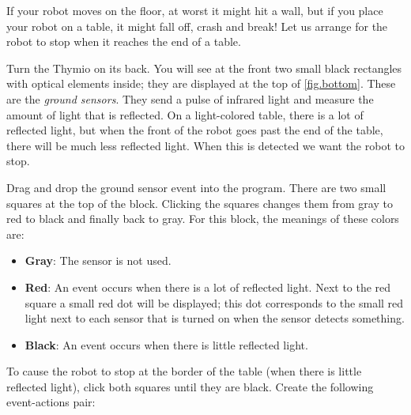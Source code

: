 If your robot moves on the floor, at worst it might hit a wall, but if
you place your robot on a table, it might fall off, crash and break! Let
us arrange for the robot to stop when it reaches the end of a table.


Turn the Thymio on its back. You will see at the front two small black
rectangles with optical elements inside; they are displayed at the top
of \cref{fig.bottom}. These are the \emph{ground sensors}. They send a
pulse of infrared light and measure the amount of light that is
reflected. On a light-colored table, there is a lot of reflected light,
but when the front of the robot goes past the end of the table, there
will be much less reflected light. When this is detected we want the
robot to stop.


Drag and drop the ground sensor event  into the
program. There are two small squares at the top of the block. Clicking
the squares changes them from gray to red to black and finally back to
gray. For this block, the meanings of these colors are:

\begin{itemize}

\item \textbf{Gray}: The sensor is not used.

\item \textbf{Red}: An event occurs when there is a lot of reflected
light.\label{p.proximity-colors1} Next to the red square a small red dot
will be displayed; this dot corresponds to the small red light next to
each sensor that is turned on when the sensor detects something.

\item \textbf{Black}: An event occurs when there is little reflected light.

\end{itemize}


To cause the robot to stop at the border of the table (when there is
little reflected light), click both squares until they are black.
Create the following event-actions pair: 

